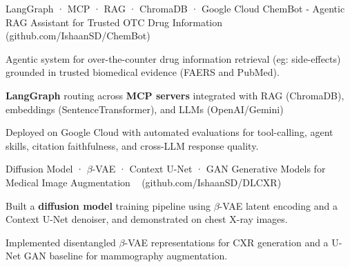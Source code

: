 \documentclass[11pt, a4paper]{awesome-cv}
\begin{document}
\begin{cventries}
    \cventry
    {LangGraph · MCP · RAG · ChromaDB · Google Cloud}
    {{ChemBot - Agentic RAG Assistant for Trusted OTC Drug Information}}
    {~}
    {(github.com/IshaanSD/ChemBot)}
    {
        \begin{cvitems}
            \item {Agentic system for over-the-counter drug information retrieval (eg: side-effects) grounded in trusted biomedical evidence (FAERS and PubMed).}
            \item {\textbf{LangGraph} routing across \textbf{MCP servers} integrated with RAG (ChromaDB), embeddings (SentenceTransformer), and LLMs (OpenAI/Gemini)}
            \item {Deployed on Google Cloud with automated evaluations for tool-calling, agent skills, citation faithfulness, and cross-LLM response quality.}
        \end{cvitems}
    }

  \cventry
    {Diffusion Model · $\beta$-VAE · Context U-Net · GAN}
    {Generative Models for Medical Image Augmentation}
    {~}
    {(github.com/IshaanSD/DLCXR)}
    {
        \begin{cvitems}
            \item {Built a \textbf{diffusion model} training pipeline using $\beta$-VAE latent encoding and a Context U-Net denoiser, and demonstrated on chest X-ray images.}
            \item {Implemented disentangled $\beta$-VAE representations for CXR generation and a U-Net GAN baseline for mammography augmentation.}
        \end{cvitems}
    }



\end{cventries}
\end{document}

